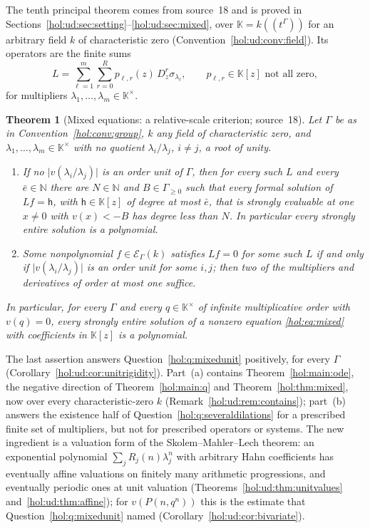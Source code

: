 \documentclass[11pt]{article}
\numberwithin{equation}{section}
\newtheorem{maintheorem}{Theorem}
\theoremstyle{definition}
\theoremstyle{remark}
\newcommand{\N}{\mathbb N}
\newcommand{\abs}[1]{\lvert#1\rvert}
\newcommand{\KK}{\mathbb K}
\newcommand{\EK}{\mathcal E_\Gamma(k)}
\begin{document}
The tenth principal theorem comes from source~18 and is proved in
Sections~\ref{hol:ud:sec:setting}--\ref{hol:ud:sec:mixed}, over
$\KK=k((t^\Gamma))$ for an arbitrary field $k$ of characteristic zero
(Convention~\ref{hol:ud:conv:field}). Its operators are the finite sums
\[
 L=\sum_{\ell=1}^m\sum_{r=0}^Rp_{\ell,r}(z)\,D_z^r\sigma_{\lambda_\ell},\qquad
 p_{\ell,r}\in\KK[z]\text{ not all zero},
\]
for multipliers $\lambda_1,\ldots,\lambda_m\in\KK^\times$.

\begin{maintheorem}[Mixed equations: a relative-scale criterion;
source~18]\label{hol:ud:main:mixed}
Let $\Gamma$ be as in Convention~\ref{hol:conv:group}, $k$ any field of
characteristic zero, and $\lambda_1,\ldots,\lambda_m\in\KK^\times$ with no
quotient $\lambda_i/\lambda_j$, $i\ne j$, a root of unity.
\begin{enumerate}[label=\textup{(\alph*)}]
\item If no $\abs{v(\lambda_i/\lambda_j)}$ is an order unit of $\Gamma$, then
for every such $L$ and every $\bar e\in\N$ there are $N\in\N$ and
$B\in\Gamma_{\ge0}$ such that every formal solution of $Lf=\mathsf h$, with
$\mathsf h\in\KK[z]$ of degree at most $\bar e$, that is strongly evaluable at
one $x\ne0$ with $v(x)<-B$ has degree less than $N$. In particular every
strongly entire solution is a polynomial.
\item Some nonpolynomial $f\in\EK$ satisfies $Lf=0$ for some such $L$ if and
only if $\abs{v(\lambda_i/\lambda_j)}$ is an order unit for some $i,j$; then
two of the multipliers and derivatives of order at most one suffice.
\end{enumerate}
In particular, for every $\Gamma$ and every $q\in\KK^\times$ of infinite
multiplicative order with $v(q)=0$, every strongly entire solution of a
nonzero equation \eqref{hol:eq:mixed} with coefficients in $\KK[z]$ is a
polynomial.
\end{maintheorem}

The last assertion answers Question~\ref{hol:q:mixedunit} positively, for
every $\Gamma$ (Corollary~\ref{hol:ud:cor:unitrigidity}). Part~(a) contains
Theorem~\ref{hol:main:ode}, the negative direction of
Theorem~\ref{hol:main:q} and Theorem~\ref{hol:thm:mixed}, now over every
characteristic-zero $k$ (Remark~\ref{hol:ud:rem:contains}); part~(b) answers
the existence half of Question~\ref{hol:q:severaldilations} for a prescribed
finite set of multipliers, but not for prescribed operators or systems. The
new ingredient is a valuation form of the Skolem--Mahler--Lech theorem: an
exponential polynomial $\sum_jR_j(n)\lambda_j^n$ with arbitrary Hahn
coefficients has eventually affine valuations on finitely many arithmetic
progressions, and eventually periodic ones at unit valuation
(Theorems~\ref{hol:ud:thm:unitvalues} and~\ref{hol:ud:thm:affine}); for
$v(P(n,q^n))$ this is the estimate that Question~\ref{hol:q:mixedunit} named
(Corollary~\ref{hol:ud:cor:bivariate}).
\end{document}
